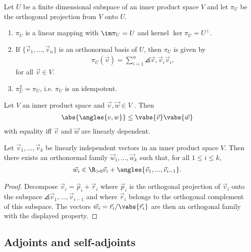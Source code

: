 \documentclass{article}
\begin{document}
\begin{proposition}[Proposition 5.2.4]
	Let $U$ be a finite dimensional subspace of an inner product space $V$ and let $\pi_U$ be the
	orthogonal projection from $V$ onto $U$.
	\begin{enumerate}
		\item $\pi_U$ is a linear mapping with $\im \pi_U=U$ and kernel $\ker \pi_U = U^\bot$.
		\item If $\{\vec v_1,...,\vec v_n\}$ is an orthonormal basis of $U$, then $\pi_U$ is given
		      by
		      \begin{align*}
			      \pi_U(\vec v)=\sum_{i=1}^n\angles{\vec v,\vec v_i}\vec v_i,
		      \end{align*}
		      for all $\vec v\in V$.
		\item $\pi_U^2=\pi_U$, i.e. $\pi_U$ is an idempotent.
	\end{enumerate}
\end{proposition}

\begin{theorem}
	Let $V$ an inner product space and $\vec v,\vec w\in V$ . Then
	\begin{align*}
		\abs{\angles{v,w}}\leq \vabs{\vec v}\vabs{\vec w}
	\end{align*}
	with equality iff $\vec v$ and $\vec w$ are linearly dependent.
\end{theorem}

\begin{theorem}[Theorem 5.2.7]
	Let $\vec v_1,...,\vec v_k$ be linearly independent vectors in an inner product space $V$. Then
	there exists an orthonormal family $\vec w_1,...,\vec w_k$ such that, for all $1\leq i\leq k$,
	\begin{align*}
		\vec w_i\in \R_{>0}\vec v_i + \angles{\vec v_1,...,\vec v_{i-1}}.
	\end{align*}
	\begin{proof}
		Decompose $\vec v_i=\vec p_i+\vec r_i$ where $\vec p_i$ is the orthogonal projection of $\vec v_i$
		onto the subspace $\angles{\vec v_1,...,\vec v_{i-1}}$ and where $\vec r_i$ belongs to the orthogonal
		complement of this subspace. The vectors $\vec w_i=\vec r_i/\vabs{\vec r_i}$ are then an orthogonal
		family with the displayed property.
	\end{proof}
\end{theorem}

\subsection{Adjoints and self-adjoints}
\end{document}
